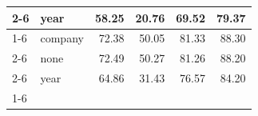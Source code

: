 \begin{table}
\begin{tabular}{llrrrr}
\cline{2-6}
 & year & {\cellcolor[HTML]{FFF5EB}} \color[HTML]{000000} 58.25 & {\cellcolor[HTML]{FFF5EB}} \color[HTML]{000000} 20.76 & {\cellcolor[HTML]{FFF5EB}} \color[HTML]{000000} 69.52 & {\cellcolor[HTML]{FFF5EB}} \color[HTML]{000000} 79.37 \\
\cline{1-6} \cline{2-6}
\multirow[c]{3}{*}{LR} & company & {\cellcolor[HTML]{D34601}} \color[HTML]{F1F1F1} 72.38 & {\cellcolor[HTML]{9E3303}} \color[HTML]{F1F1F1} 50.05 & {\cellcolor[HTML]{D04501}} \color[HTML]{F1F1F1} 81.33 & {\cellcolor[HTML]{CD4401}} \color[HTML]{F1F1F1} 88.30 \\
\cline{2-6}
 & none & {\cellcolor[HTML]{D04501}} \color[HTML]{F1F1F1} 72.49 & {\cellcolor[HTML]{9B3203}} \color[HTML]{F1F1F1} 50.27 & {\cellcolor[HTML]{D14501}} \color[HTML]{F1F1F1} 81.26 & {\cellcolor[HTML]{D04501}} \color[HTML]{F1F1F1} 88.20 \\
\cline{2-6}
 & year & {\cellcolor[HTML]{FDB373}} \color[HTML]{000000} 64.86 & {\cellcolor[HTML]{FDBA7F}} \color[HTML]{000000} 31.43 & {\cellcolor[HTML]{FD984B}} \color[HTML]{000000} 76.57 & {\cellcolor[HTML]{FDA159}} \color[HTML]{000000} 84.20 \\
\cline{1-6} \cline{2-6}
\bottomrule
\end{tabular}
\end{table}
